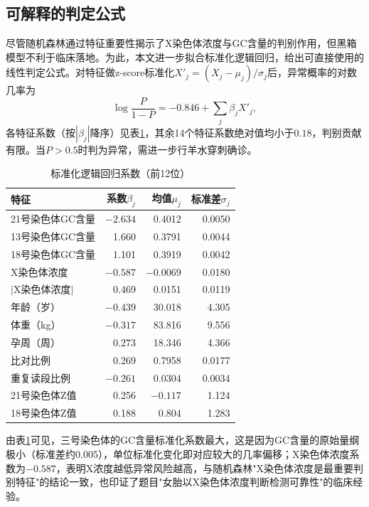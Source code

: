 \documentclass[12pt]{ctexart}
\begin{document}
\subsection{可解释的判定公式}

尽管随机森林通过特征重要性揭示了X染色体浓度与GC含量的判别作用，但黑箱模型不利于临床落地。为此，本文进一步拟合标准化逻辑回归，给出可直接使用的线性判定公式。对特征做z-score标准化$X'_j=(X_j-\mu_j)/\sigma_j$后，异常概率的对数几率为
\begin{equation}
\log\frac{P}{1-P}=-0.846+\sum_{j}\beta_j X'_j,
\end{equation}
各特征系数（按$|\beta_j|$降序）见表\ref{tab:logreg}，其余14个特征系数绝对值均小于$0.18$，判别贡献有限。当$P>0.5$时判为异常，需进一步行羊水穿刺确诊。

\begin{table}[H]
\centering
\caption{标准化逻辑回归系数（前12位）}
\label{tab:logreg}
\begin{tabular}{lrrr}
\toprule
特征 & 系数$\beta_j$ & 均值$\mu_j$ & 标准差$\sigma_j$ \\
\midrule
21号染色体GC含量 & $-2.634$ & 0.4012 & 0.0050 \\
13号染色体GC含量 & 1.660 & 0.3791 & 0.0044 \\
18号染色体GC含量 & 1.101 & 0.3919 & 0.0042 \\
X染色体浓度 & $-0.587$ & $-0.0069$ & 0.0180 \\
$|$X染色体浓度$|$ & 0.469 & 0.0151 & 0.0119 \\
年龄（岁） & $-0.439$ & 30.018 & 4.305 \\
体重（kg） & $-0.317$ & 83.816 & 9.556 \\
孕周（周） & 0.273 & 18.346 & 4.366 \\
比对比例 & 0.269 & 0.7958 & 0.0177 \\
重复读段比例 & $-0.261$ & 0.0304 & 0.0034 \\
21号染色体Z值 & 0.256 & $-0.117$ & 1.124 \\
18号染色体Z值 & 0.188 & 0.804 & 1.283 \\
\bottomrule
\end{tabular}
\end{table}

由表\ref{tab:logreg}可见，三号染色体的GC含量标准化系数最大，这是因为GC含量的原始量纲极小（标准差约$0.005$），单位标准化变化即对应较大的几率偏移；X染色体浓度系数为$-0.587$，表明X浓度越低异常风险越高，与随机森林"X染色体浓度是最重要判别特征"的结论一致，也印证了题目"女胎以X染色体浓度判断检测可靠性"的临床经验。
\end{document}
